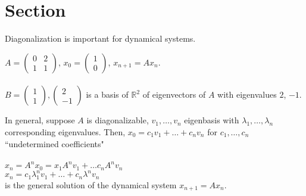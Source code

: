 \documentclass[letterpaper,12pt]{article}
\begin{document}
\section*{Section}
Diagonalization is important for dynamical systems.
\begin{example}
$A = \begin{pmatrix} 0 & 2 \\ 1 & 1 \end{pmatrix}$, $x_0 = \begin{pmatrix} 1 \\ 0 \end{pmatrix}$, $x_{n+1} = Ax_n$.
\\ \\ $B = \begin{pmatrix} 1 \\ 1 \end{pmatrix}, \begin{pmatrix} 2 \\ -1 \end{pmatrix}$ is a basis of $\mathbb{R}^2$ of eigenvectors of $A$ with eigenvalues $2$, $-1$.
\end{example}
In general, suppose $A$ is diagonalizable, $v_1, \dots, v_n$ eigenbasis with $\lambda_1, \dots, \lambda_n$ corresponding eigenvalues. Then, $x_0 = c_1v_1 + \dots + c_nv_n$ for $c_1, \dots, c_n$ ``undetermined coefficients"
\\ \\ $x_n = A^n x_0 = x_1A^nv_1 + \dots c_nA^nv_n$
\\ $\boxed{x_n = c_1 \lambda_1^n v_1 + \dots + c_n \lambda^n v_n}$
\\ is the general solution of the dynamical system $x_{n+1} = Ax_n$.
\end{document}
